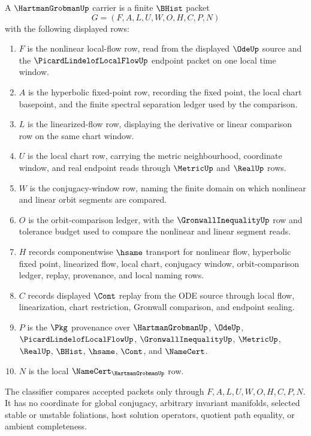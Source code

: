\begin{definition}
\label{def:hartman-grobman-carrier}
A $\HartmanGrobmanUp$ carrier is a finite $\BHist$ packet
$$
G=(F,A,L,U,W,O,H,C,P,N)
$$
with the following displayed rows:
\begin{enumerate}
\item $F$ is the nonlinear local-flow row, read from the displayed $\OdeUp$ source and the $\PicardLindelofLocalFlowUp$ endpoint packet on one local time window.
\item $A$ is the hyperbolic fixed-point row, recording the fixed point, the local chart basepoint, and the finite spectral separation ledger used by the comparison.
\item $L$ is the linearized-flow row, displaying the derivative or linear comparison row on the same chart window.
\item $U$ is the local chart row, carrying the metric neighbourhood, coordinate window, and real endpoint reads through $\MetricUp$ and $\RealUp$ rows.
\item $W$ is the conjugacy-window row, naming the finite domain on which nonlinear and linear orbit segments are compared.
\item $O$ is the orbit-comparison ledger, with the $\GronwallInequalityUp$ row and tolerance budget used to compare the nonlinear and linear segment reads.
\item $H$ records componentwise $\hsame$ transport for nonlinear flow, hyperbolic fixed point, linearized flow, local chart, conjugacy window, orbit-comparison ledger, replay, provenance, and local naming rows.
\item $C$ records displayed $\Cont$ replay from the ODE source through local flow, linearization, chart restriction, Gronwall comparison, and endpoint sealing.
\item $P$ is the $\Pkg$ provenance over $\HartmanGrobmanUp$, $\OdeUp$, $\PicardLindelofLocalFlowUp$, $\GronwallInequalityUp$, $\MetricUp$, $\RealUp$, $\BHist$, $\hsame$, $\Cont$, and $\NameCert$.
\item $N$ is the local $\NameCert_{\HartmanGrobmanUp}$ row.
\end{enumerate}
The classifier compares accepted packets only through $F,A,L,U,W,O,H,C,P,N$. It has no coordinate for global conjugacy, arbitrary invariant manifolds, selected stable or unstable foliations, host solution operators, quotient path equality, or ambient completeness.
\end{definition}

